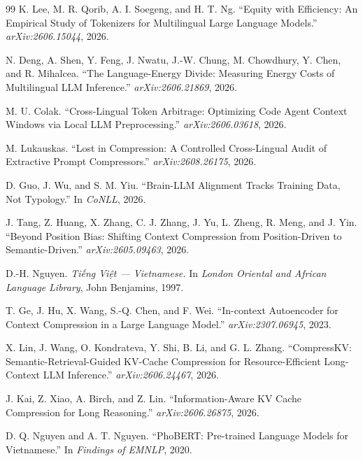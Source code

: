 \documentclass[12pt,a4paper]{article}
\begin{document}
\begin{thebibliography}{99}
K. Lee, M. R. Qorib, A. I. Soegeng, and H. T. Ng.
\newblock ``Equity with Efficiency: An Empirical Study of Tokenizers for Multilingual Large Language Models.''
\newblock \emph{arXiv:2606.15044}, 2026.

N. Deng, A. Shen, Y. Feng, J. Nwatu, J.-W. Chung, M. Chowdhury, Y. Chen, and R. Mihalcea.
\newblock ``The Language-Energy Divide: Measuring Energy Costs of Multilingual LLM Inference.''
\newblock \emph{arXiv:2606.21869}, 2026.

M. U. Colak.
\newblock ``Cross-Lingual Token Arbitrage: Optimizing Code Agent Context Windows via Local LLM Preprocessing.''
\newblock \emph{arXiv:2606.03618}, 2026.

M. Lukauskas.
\newblock ``Lost in Compression: A Controlled Cross-Lingual Audit of Extractive Prompt Compressors.''
\newblock \emph{arXiv:2608.26175}, 2026.

D. Guo, J. Wu, and S. M. Yiu.
\newblock ``Brain-LLM Alignment Tracks Training Data, Not Typology.''
\newblock In \emph{CoNLL}, 2026.

J. Tang, Z. Huang, X. Zhang, C. J. Zhang, J. Yu, L. Zheng, R. Meng, and J. Yin.
\newblock ``Beyond Position Bias: Shifting Context Compression from Position-Driven to Semantic-Driven.''
\newblock \emph{arXiv:2605.09463}, 2026.

D.-H. Nguyen.
\newblock \emph{Tiếng Việt --- Vietnamese.}
\newblock In \emph{London Oriental and African Language Library}, John Benjamins, 1997.

T. Ge, J. Hu, X. Wang, S.-Q. Chen, and F. Wei.
\newblock ``In-context Autoencoder for Context Compression in a Large Language Model.''
\newblock \emph{arXiv:2307.06945}, 2023.

X. Lin, J. Wang, O. Kondrateva, Y. Shi, B. Li, and G. L. Zhang.
\newblock ``CompressKV: Semantic-Retrieval-Guided KV-Cache Compression for Resource-Efficient Long-Context LLM Inference.''
\newblock \emph{arXiv:2606.24467}, 2026.

J. Kai, Z. Xiao, A. Birch, and Z. Lin.
\newblock ``Information-Aware KV Cache Compression for Long Reasoning.''
\newblock \emph{arXiv:2606.26875}, 2026.


D. Q. Nguyen and A. T. Nguyen.
\newblock ``PhoBERT: Pre-trained Language Models for Vietnamese.''
\newblock In \emph{Findings of EMNLP}, 2020.


\end{thebibliography}
\end{document}
